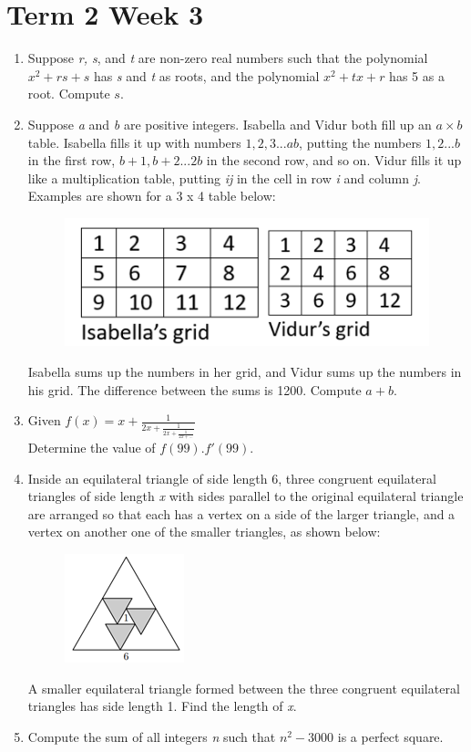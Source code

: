 \documentclass[../main.tex]{subfiles}
\begin{document}
\section*{Term 2 Week 3}
\begin{enumerate}
    \item 
    Suppose \textit{r, s}, and \textit{t} are non-zero real numbers such that the polynomial \(x^2+rs+s\) has \textit{s} and \textit{t} as roots, and the polynomial \(x^2+tx+r\) has 5 as a root. Compute \(s\).\\

    \item 
    Suppose \textit{a} and \textit{b} are positive integers. Isabella and Vidur both fill up an \(a\times b\) table. Isabella fills it up with numbers \(1,2,3...ab\), putting the numbers \(1,2...b\) in the first row, \(b+1, b+2...2b\) in the second row, and so on. Vidur fills it up like a multiplication table, putting \textit{ij} in the cell in row \textit{i} and column \textit{j}.\\
    
    Examples are shown for a 3 x 4 table below:
    \begin{figure}[H]
        \centering
        \includegraphics[width=0.3\linewidth]{images/t2w3q2.png}
    \end{figure}
    Isabella sums up the numbers in her grid, and Vidur sums up the numbers in his grid. The difference between the sums is 1200. Compute \(a+b\).\\
    
    \item 
    Given \(f(x)=x+\frac{1}{2x+\frac{1}{2x+\frac{1}{2x+...}}}\)\\

    Determine the value of \(f(99).f'(99)\).\\

    \item 
    Inside an equilateral triangle of side length 6, three congruent equilateral triangles of side length \textit{x} with sides parallel to the original equilateral triangle are arranged so that each has a vertex on a side of the larger triangle, and a vertex on another one of the smaller triangles, as shown below:\\
    \begin{figure}[H]
        \centering
        \includegraphics{images/t2w3q4.png}
    \end{figure}
    A smaller equilateral triangle formed between the three congruent equilateral triangles has side length 1. Find the length of \textit{x}.\\

    \item 
    Compute the sum of all integers \textit{n} such that \(n^2-3000\) is a perfect square.

    
\end{enumerate}
\end{document}
